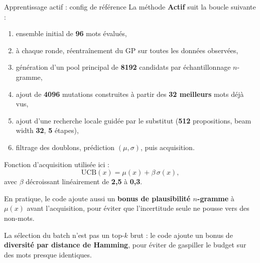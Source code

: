 \documentclass[aspectratio=169,10pt]{beamer}
\begin{document}
\begin{frame}{Apprentissage actif : config de référence}
\justifying
\small
La méthode \textbf{Actif} suit la boucle suivante :
\begin{enumerate}
  \item ensemble initial de \textbf{96} mots évalués,
  \item à chaque ronde, réentraînement du GP sur toutes les données observées,
  \item génération d'un pool principal de \textbf{8192} candidats par
  échantillonnage \(n\)-gramme,
  \item ajout de \textbf{4096} mutations construites à partir des
  \textbf{32 meilleurs} mots déjà vus,
  \item ajout d'une recherche locale guidée par le substitut
  (\textbf{512} propositions, beam width \textbf{32}, \textbf{5} étapes),
  \item filtrage des doublons, prédiction \((\mu,\sigma)\), puis acquisition.
\end{enumerate}

\vspace{0.4em}
Fonction d'acquisition utilisée ici :
\[
\mathrm{UCB}(x)=\mu(x)+\beta\,\sigma(x),
\]
avec \(\beta\) décroissant linéairement de \textbf{2,5} à \textbf{0,3}.

\vspace{0.4em}
En pratique, le code ajoute aussi un \textbf{bonus de plausibilité \(n\)-gramme}
à \(\mu(x)\) avant l'acquisition, pour éviter que l'incertitude seule ne pousse
vers des non-mots.

\vspace{0.4em}
La sélection du batch n'est pas un top-\(k\) brut : le code ajoute un bonus de
\textbf{diversité par distance de Hamming}, pour éviter de gaspiller le budget
sur des mots presque identiques.
\end{frame}
\end{document}
